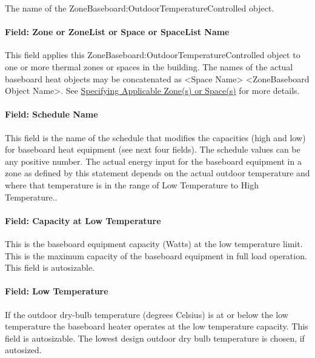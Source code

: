 The name of the ZoneBaseboard:OutdoorTemperatureControlled object.

\paragraph{Field: Zone or ZoneList or Space or SpaceList Name}\label{bbheat-field-zone-or-zonelist-name-000}

This field applies this ZoneBaseboard:OutdoorTemperatureControlled object to one or more thermal zones or spaces in the building. The names of the actual baseboard heat objects may be concatenated as \textless{}Space Name\textgreater{} \textless{}ZoneBaseboard Object Name\textgreater{}. See \hyperref[specifying-applicable-zones-or-spaces]{Specifying Applicable Zone(s) or Space(s)} for more details.

\paragraph{Field: Schedule Name}\label{field-schedule-name-11}

This field is the name of the schedule that modifies the capacities (high and low) for baseboard heat equipment (see next four fields). The schedule values can be any positive number. The actual energy input for the baseboard equipment in a zone as defined by this statement depends on the actual outdoor temperature and where that temperature is in the range of Low Temperature to High Temperature..

\paragraph{Field: Capacity at Low Temperature}\label{field-capacity-at-low-temperature}

This is the baseboard equipment capacity (Watts) at the low temperature limit. This is the maximum capacity of the baseboard equipment in full load operation. This field is autosizable.

\paragraph{Field: Low Temperature}\label{field-low-temperature}

If the outdoor dry-bulb temperature (degrees Celsius) is at or below the low temperature the baseboard heater operates at the low temperature capacity. This field is autosizable. The lowest design outdoor dry bulb temperature is chosen, if autosized.

